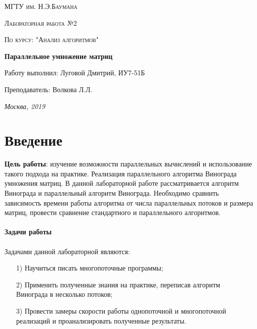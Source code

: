 \documentclass[a4paper,12pt]{report}
\begin{document}
\begin{titlepage}
	\centering
	{\scshape\LARGE МГТУ им. Н.Э.Баумана \par}
	\vspace{4cm}
	{\scshape\Large Лабораторная работа №2\par}
	\vspace{0.5cm}	
	{\scshape\Large По курсу: "Анализ алгоритмов"\par}
	\vspace{2cm}
	{\huge\bfseries Параллельное умножение матриц\par}
	\vspace{3cm}
	\Large Работу выполнил: Луговой Дмитрий, ИУ7-51Б\par
	\vspace{0.5cm}
	\Large Преподаватель:  Волкова Л.Л.\par

	\vfill
	\large \textit {Москва, 2019} \par
\end{titlepage}

\setcounter{page}{2}

\tableofcontents

\newpage
\chapter*{Введение}
\hspace{0.6cm} \textbf{Цель работы}: изучение возможности параллельных вычислений и использование такого подхода на практике. Реализация параллельного алгоритма Винограда умножения матриц. 
В данной лабораторной работе рассматривается алгоритм Винограда и параллельный алгоритм Винограда. Необходимо сравнить зависимость времени работы алгоритма от числа параллельных потоков и размера матриц, провести сравнение стандартного и параллельного алгоритмов.\\\\

\textbf{\LARGE Задачи работы}\\\\
Задачами данной лабораторной являются:
\begin{enumerate}
\item[1)] Научиться писать многопоточные программы;
\item[2)] Применить полученные знания на практике, переписав алгоритм Винограда в несколько потоков;
\item[3)] Провести замеры скорости работы однопоточной и многопоточной реализаций и проанализировать полученные результаты.
\end{enumerate}
\end{document}
